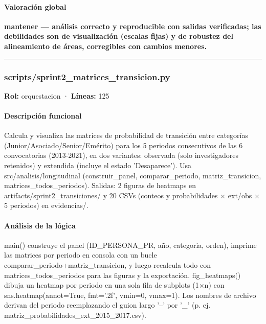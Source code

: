\paragraph{Valoración global}
\textbf{mantener --- análisis correcto y reproducible con salidas verificadas; las debilidades son de visualización (escalas fijas) y de robustez del alineamiento de áreas, corregibles con cambios menores.}

\medskip
\hrule

\subsubsection{scripts/sprint2\_matrices\_transicion.py}
\textbf{Rol:} orquestacion · \textbf{Líneas:} 125

\paragraph{Descripción funcional}
Calcula y visualiza las matrices de probabilidad de transición entre categorías (Junior/Asociado/Senior/Emérito) para los 5 periodos consecutivos de las 6 convocatorias (2013-2021), en dos variantes: observada (solo investigadores retenidos) y extendida (incluye el estado 'Desaparece'). Usa src/analisis/longitudinal (construir\_panel, comparar\_periodo, matriz\_transicion, matrices\_todos\_periodos). Salidas: 2 figuras de heatmaps en artifacts/sprint2\_transiciones/ y 20 CSVs (conteos y probabilidades $\times$ ext/obs $\times$ 5 periodos) en evidencias/.

\paragraph{Análisis de la lógica}
main() construye el panel (ID\_PERSONA\_PR, año, categoria, orden), imprime las matrices por periodo en consola con un bucle comparar\_periodo+matriz\_transicion, y luego recalcula todo con matrices\_todos\_periodos para las figuras y la exportación. fig\_heatmaps() dibuja un heatmap por periodo en una sola fila de subplots (1$\times$n) con sns.heatmap(annot=True, fmt='.2f', vmin=0, vmax=1). Los nombres de archivo derivan del periodo reemplazando el guion largo '--' por '\_' (p. ej. matriz\_probabilidades\_ext\_2015\_2017.csv).

